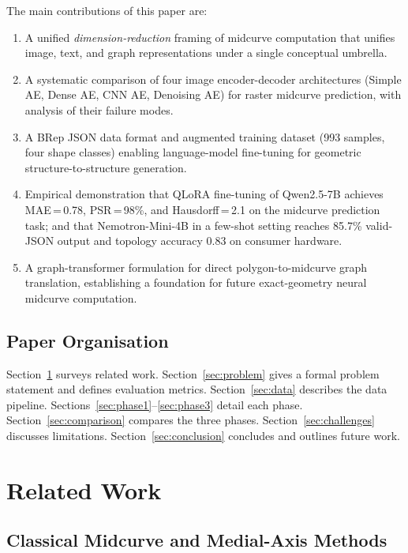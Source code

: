 \documentclass[journal]{IEEEtran}
\begin{document}
The main contributions of this paper are:
\begin{enumerate}
  \item A unified \emph{dimension-reduction} framing of midcurve computation
        that unifies image, text, and graph representations under a single
        conceptual umbrella.
  \item A systematic comparison of four image encoder-decoder architectures
        (Simple AE, Dense AE, CNN AE, Denoising AE) for raster midcurve
        prediction, with analysis of their failure modes.
  \item A BRep JSON data format and augmented training dataset (993 samples,
        four shape classes) enabling language-model fine-tuning for geometric
        structure-to-structure generation.
  \item Empirical demonstration that QLoRA fine-tuning of Qwen2.5-7B achieves
        MAE\,=\,0.78, PSR\,=\,98\%, and Hausdorff\,=\,2.1 on the midcurve
        prediction task; and that Nemotron-Mini-4B in a few-shot setting reaches
        85.7\% valid-JSON output and topology accuracy 0.83 on consumer hardware.
  \item A graph-transformer formulation for direct polygon-to-midcurve graph
        translation, establishing a foundation for future exact-geometry neural
        midcurve computation.
\end{enumerate}

\subsection*{Paper Organisation}

Section~\ref{sec:related} surveys related work.
Section~\ref{sec:problem} gives a formal problem statement and defines
evaluation metrics.  Section~\ref{sec:data} describes the data pipeline.
Sections~\ref{sec:phase1}--\ref{sec:phase3} detail each phase.
Section~\ref{sec:comparison} compares the three phases.
Section~\ref{sec:challenges} discusses limitations.
Section~\ref{sec:conclusion} concludes and outlines future work.

\section{Related Work}
\label{sec:related}

\subsection{Classical Midcurve and Medial-Axis Methods}
\end{document}
